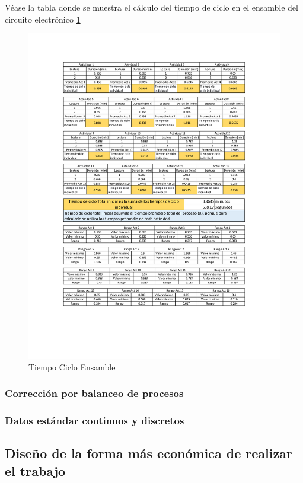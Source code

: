     Véase la tabla donde se muestra el cálculo del tiempo de ciclo en el ensamble del circuito electrónico \ref{fig:tiempoCicloEnsamble}
    \begin{figure}[H]
        \centering
        \includegraphics[scale=0.4]{3/Img/tiempoCicloEnsamble.pdf}
        \caption{Tiempo Ciclo Ensamble} 
        \label{fig:tiempoCicloEnsamble}
    \end{figure}
    \subsubsection{Corrección por balanceo de procesos}
    \subsubsection{Datos estándar continuos y discretos}
    \subsection{Diseño de la forma más económica de realizar el trabajo}
    
